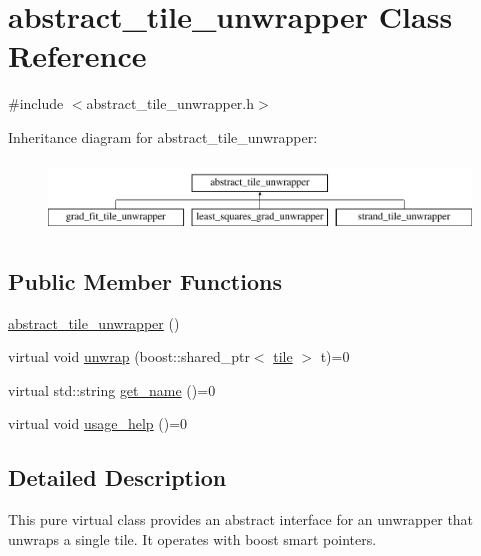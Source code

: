 \hypertarget{classabstract__tile__unwrapper}{\section{abstract\-\_\-tile\-\_\-unwrapper Class Reference}
\label{classabstract__tile__unwrapper}
}


{\ttfamily \#include $<$abstract\-\_\-tile\-\_\-unwrapper.\-h$>$}

Inheritance diagram for abstract\-\_\-tile\-\_\-unwrapper\-:\begin{figure}[H]
\begin{center}
\leavevmode
\includegraphics[height=1.885522cm]{classabstract__tile__unwrapper}
\end{center}
\end{figure}
\subsection*{Public Member Functions}
\begin{DoxyCompactItemize}
\item 
\hyperlink{classabstract__tile__unwrapper_a31fc3a41d4adaab0ba7c2998e74ccedb}{abstract\-\_\-tile\-\_\-unwrapper} ()
\item 
virtual void \hyperlink{classabstract__tile__unwrapper_a74eedd36e55b9000b5986ff5980a563a}{unwrap} (boost\-::shared\-\_\-ptr$<$ \hyperlink{classtile}{tile} $>$ t)=0
\item 
virtual std\-::string \hyperlink{classabstract__tile__unwrapper_ae70f69a703e622e5ab13eabcc91fca4d}{get\-\_\-name} ()=0
\item 
virtual void \hyperlink{classabstract__tile__unwrapper_a469b36a7f302d5a2655631bbdb6f8daf}{usage\-\_\-help} ()=0
\end{DoxyCompactItemize}


\subsection{Detailed Description}
This pure virtual class provides an abstract interface for an unwrapper that unwraps a single tile. It operates with boost smart pointers. 

